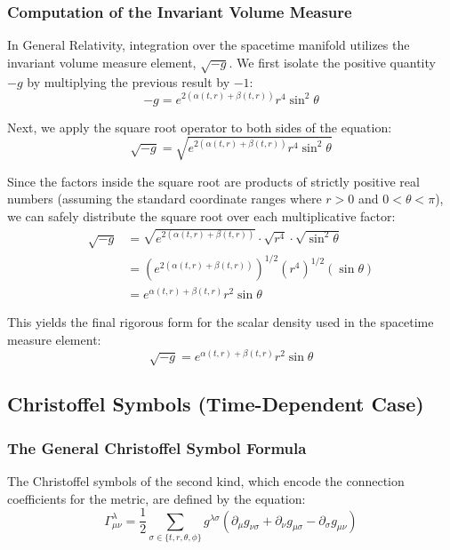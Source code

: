 \documentclass[11pt, a4paper]{report}
\begin{document}
\subsubsection*{Computation of the Invariant Volume Measure}
In General Relativity, integration over the spacetime manifold utilizes the invariant volume measure element, $\sqrt{-g}$. We first isolate the positive quantity $-g$ by multiplying the previous result by $-1$:
\begin{equation}
    -g = e^{2(\alpha(t,r) + \beta(t,r))} r^4 \sin^2\theta
\end{equation}

Next, we apply the square root operator to both sides of the equation:
\begin{equation}
    \sqrt{-g} = \sqrt{ e^{2(\alpha(t,r) + \beta(t,r))} r^4 \sin^2\theta }
\end{equation}

Since the factors inside the square root are products of strictly positive real numbers (assuming the standard coordinate ranges where $r > 0$ and $0 < \theta < \pi$), we can safely distribute the square root over each multiplicative factor:
\begin{align}
    \sqrt{-g} &= \sqrt{ e^{2(\alpha(t,r) + \beta(t,r))} } \cdot \sqrt{ r^4 } \cdot \sqrt{ \sin^2\theta } \nonumber \\
    &= \left( e^{2(\alpha(t,r) + \beta(t,r))} \right)^{1/2} \left( r^4 \right)^{1/2} \left( \sin\theta \right) \nonumber \\
    &= e^{\alpha(t,r) + \beta(t,r)} r^2 \sin\theta
\end{align}

This yields the final rigorous form for the scalar density used in the spacetime measure element:
\begin{equation}
    \sqrt{-g} = e^{\alpha(t,r) + \beta(t,r)} r^2 \sin\theta
\end{equation}


\subsection{Christoffel Symbols (Time-Dependent Case)}

\subsubsection*{The General Christoffel Symbol Formula}

The Christoffel symbols of the second kind, which encode the connection coefficients for the metric, are defined by the equation:
\begin{equation}
    \Gamma^\lambda_{\mu\nu} = \frac{1}{2} \sum_{\sigma \in \{t, r, \theta, \phi\}} g^{\lambda\sigma} (\partial_\mu g_{\nu\sigma} + \partial_\nu g_{\mu\sigma} - \partial_\sigma g_{\mu\nu}) \label{eq:christoffel_def}
\end{equation}
\end{document}
